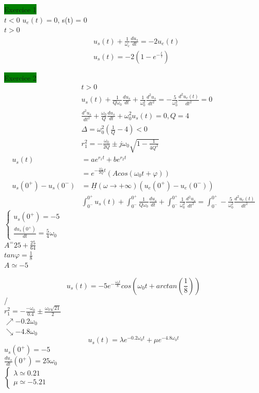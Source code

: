 \documentclass[a4paper,twocolumn,landscape]{article}
\begin{document}
\colorbox{green}{Exercice 1}\\

\underline{\(t < 0\)} \(u_e(t) = 0\), s(t) = 0\\
\underline{\(t > 0\)} \begin{align*}
    &u_s(t) + \frac{1}{\omega_c}\frac{du_s}{dt} = -2u_e(t)\\
    &u_s(t) = -2(1-e^{-\frac{t}{\tau}})
\end{align*}

\colorbox{green}{Exercice 2}\\
\begin{align*}
    &t > 0\\
    &u_s(t) + \frac{1}{Q\omega_0}\frac{du_s}{dt} + \frac{1}{\omega_0^2}\frac{d^2u_s}{dt^2} = -\frac{5}{\omega_0^2} \frac{d^2u_e(t)}{dt^2} = 0\\
    &\frac{d^2u_s}{dt^2} + \frac{\omega_0}{Q} \frac{du_s}{dt} + \omega_0^2u_s(t) = 0, Q=4\\
    &\Delta = \omega_0^2(\frac{1}{Q}-4) < 0\\
    &r_1^2 = -\frac{\omega_0}{2Q} \pm j\omega_0 \sqrt{1-\frac{1}{4Q^2}}\\
    u_s(t) &= ae^{r_1t} + be^{r_2t}\\
    &= e^{-\frac{\omega_0}{2Q}t}(Acos(\omega_0 t + \varphi))\\
    u_s(0^+)-u_s(0^-) &= \underline{H}(\omega \to +\infty)(u_e(0^+) - u_e(0^-))\\
    &\int_{0^-}^{0^+}u_s(t) + \int_{0^-}^{0^+}\frac{1}{Q\omega_0}\frac{du_s}{dt} + \int_{0^-}^{0^+}\frac{1}{\omega_0^2}\frac{d^2u_s}{dt^2} = \int_{0^-}^{0^+}-\frac{5}{\omega_0^2} \frac{d^2u_e(t)}{dt^2}
\end{align*}
\( \begin{cases}
        u_s(0^+) = -5\\
        \frac{du_s(0^+)}{dt} = \frac{5}{4}\omega_0
    \end{cases}\)\\
\(A^= 25 + \frac{25}{64}\)\\
\(tan\varphi = \frac{1}{8}\)\\
\(A \simeq -5\)

\begin{equation*}
    u_s(t) = -5e^{-\frac{\omega_0 t}{8}} cos(\omega_0 t + arctan(\frac{1}{8}))
\end{equation*}
/ \\
\(r_1^2 = -\frac{-\omega_0}{0.4} \pm \frac{\omega_0 \sqrt{21}}{2}\)\\
\(\nearrow -0.2 \omega_0\)\\
\(\searrow -4.8 \omega_0\)\\
\begin{equation*}
    u_s(t) = \lambda e^{-0.2\omega_0 t} + \mu e^{-4.8\omega_0 t}
\end{equation*}
\(u_s(0^+) = -5\)\\
\(\frac{du_s}{dt}(0^+) = 25\omega_0\)\\
\(\begin{cases}
    \lambda \simeq 0.21\\
    \mu \simeq -5.21
\end{cases}\)
\end{document}

